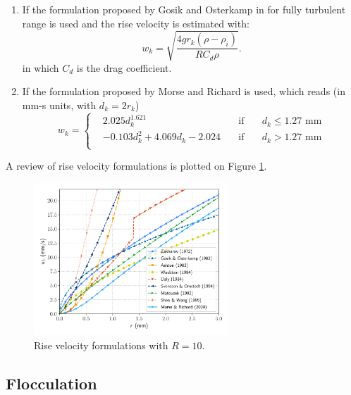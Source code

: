 \begin{enumerate}
\item If  the formulation proposed by
Gosik and Osterkamp in \cite{gosink1983measurements} for fully turbulent range
is used and the rise velocity is estimated with:
\begin{equation}
w_k=\sqrt{\frac{4gr_k(\rho-\rho_i)}{R C_d \rho}}.
\label{eq:rise_velocity}
\end{equation}
in which $C_d$ is the drag coefficient.

\item If  the formulation proposed by Morse and Richard
\cite{MORSE200986} is used, which reads (in mm-s units, with $d_k = 2 r_k$)
\begin{equation}
w_k =
\left\lbrace
	\begin{matrix}
	&  2.025 d_k^{1.621}               \quad & \text{if} & \quad d_k \leq 1.27 \text{ mm} \\
  & -0.103 d_k^2 + 4.069 d_k -2.024  \quad & \text{if} & \quad d_k > 1.27 \text{ mm} \\
\end{matrix}
\right.
\label{eq:model:rise_velocity_daly}
\end{equation}

\end{enumerate}

A review of rise velocity formulations is plotted on Figure \ref{fig:rise_velocity}.
\begin{figure}[H]
  \centering
  \includegraphics[width=0.65\textwidth]{graphics/figure_rise_velocity.pdf}
  \caption{Rise velocity formulations with $R=10$.}
  \label{fig:rise_velocity}
\end{figure}

\subsection{Flocculation}
\label{section:flocculation}

